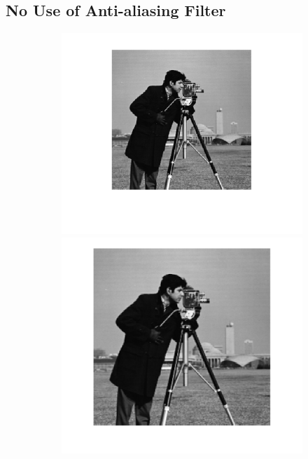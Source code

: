 \documentclass{article}
\begin{document}
\subsection*{No Use of Anti-aliasing Filter}
\begin{figure}[h!]
	\centering
	\begin{subfigure}[t]{0.3\textwidth}
		\centering
		\includegraphics[width=\linewidth]{./output_images/DOWN_no_anti-alias_nearest_scale_0_500000.png}
		\includegraphics[width=\linewidth]{./output_images/UP_no_anti-alias_nearest_scale_0_500000.png}

\end{subfigure}
\end{figure}
\end{document}
